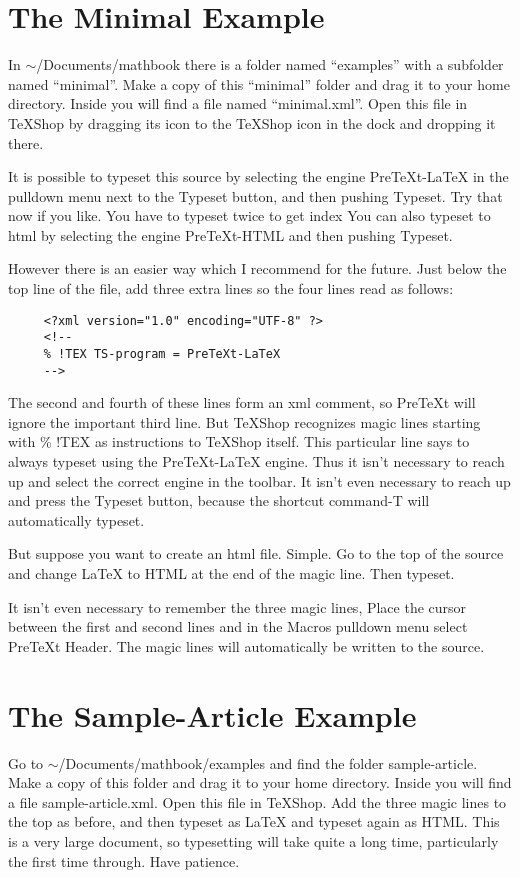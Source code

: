 \documentclass[11pt, oneside]{article}   	%
\begin{document}
\section{The Minimal Example}

In $\sim$/Documents/mathbook there is a folder named ``examples'' with a subfolder named ``minimal''. Make a copy of this ``minimal'' folder and drag it to your home directory.  Inside you will find a file named ``minimal.xml''. Open this file in TeXShop by dragging its icon to the TeXShop icon in the dock and dropping it there.

It is possible to typeset this source by selecting the engine PreTeXt-LaTeX in the pulldown menu next to the Typeset button, and then pushing Typeset. Try that now if you like. You have to typeset twice to get index You can also typeset to html by selecting the engine PreTeXt-HTML and then pushing Typeset.

However there is an easier way which I recommend for the future. Just below the top line of the file, add three extra lines so the four lines read as follows:
\begin{verbatim}
     <?xml version="1.0" encoding="UTF-8" ?>
     <!--
     % !TEX TS-program = PreTeXt-LaTeX
     -->
\end{verbatim}
The second and fourth of these lines form an xml comment, so PreTeXt will ignore the important third line. But TeXShop recognizes magic lines starting with \% !TEX as instructions to TeXShop itself. This particular line says to always typeset using the PreTeXt-LaTeX engine. Thus it isn't necessary to reach up and select the correct engine in the toolbar. It isn't even necessary to reach up and press the Typeset button, because the shortcut command-T will automatically typeset. 

But suppose you want to  create an html file. Simple. Go to the top of the source and change LaTeX to HTML at the end of the magic line. Then typeset.

It isn't even necessary to remember the three magic lines, Place the cursor between the first and second lines and in the Macros pulldown menu select PreTeXt Header. The magic lines will automatically be written to the source.

\section{The Sample-Article Example}

Go to $\sim$/Documents/mathbook/examples and find the folder sample-article. Make a copy of this folder and drag it to your home directory. Inside you will find a file sample-article.xml. Open this file in TeXShop. Add the three magic lines to the top as before, and then typeset as LaTeX and typeset again as HTML. This is a very large document, so typesetting will take quite a long time, particularly the first time through. Have patience.
\end{document}
